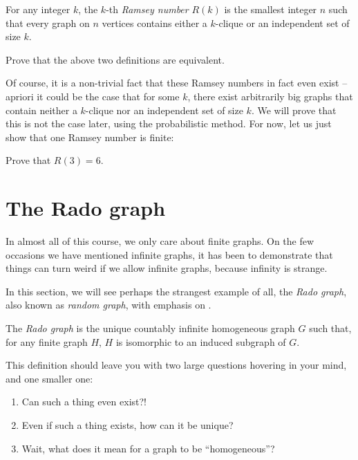 \documentclass[nobib]{tufte-handout}
\begin{document}
\begin{definition}
    For any integer $k$, the $k$-th \emph{Ramsey number} $R(k)$ is the smallest integer $n$ such that every graph on $n$ vertices contains either a $k$-clique or an independent set of size $k$.
\end{definition}

\begin{xca}
    Prove that the above two definitions are equivalent.
\end{xca}

Of course, it is a non-trivial fact that these Ramsey numbers in fact even exist -- apriori it could be the case that for some $k$, there exist arbitrarily big graphs that contain neither a $k$-clique nor an independent set of size $k$. We will prove that this is not the case later, using the probabilistic method. For now, let us just show that one Ramsey number is finite:

\begin{xca}
    Prove that $R(3) = 6$.
\end{xca}

\section{The Rado graph}

In almost all of this course, we only care about finite graphs. On the few occasions we have mentioned infinite graphs, it has been to demonstrate that things can turn weird if we allow infinite graphs, because infinity is strange.

In this section, we will see perhaps the strangest example of all, the \emph{Rado graph}, also known as  \emph{random graph}, with emphasis on .

\begin{definition}
  The \emph{Rado graph} is the unique countably infinite homogeneous graph $G$ such that, for any finite graph $H$, $H$ is isomorphic to an induced subgraph of $G$.
\end{definition}

This definition should leave you with two large questions hovering in your mind, and one smaller one:
\begin{enumerate}
  \item Can such a thing even exist?!
  \item Even if such a thing exists, how can it be unique?
  \item Wait, what does it mean for a graph to be ``homogeneous''?
\end{enumerate}
\end{document}
